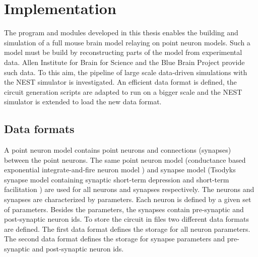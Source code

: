 %

\chapter{Implementation}

The program and modules developed in this thesis enables the building and simulation
of a full mouse brain model relaying on point neuron models. Such a model must be build by
reconstructing parts of the model from experimental data.
Allen Institute for Brain for Science and the Blue Brain Project provide such data.
To this aim, the pipeline of large scale data-driven simulations with the NEST simulator is investigated.
An efficient data format is defined, the circuit generation scripts are adapted to
run on a bigger scale and the NEST simulator is extended to load the new data format.

\section{Data formats}
\label{sec:dataformats}
A point neuron model contains point neurons and connections (synapses) between the point neurons.
The same point neuron model (conductance based exponential integrate-and-fire neuron model \cite{brette2005adaptive}) and synapse model (Tsodyks synapse model containing synaptic short-term depression and short-term facilitation \cite{tsodyks1997neural, fuhrmann2002coding}) are used for all neurons and synapses respectively.
The neurons and synapses are characterized by parameters.
Each neuron is defined by a given set of parameters.
Besides the parameters, the synapses contain pre-synaptic and post-synaptic neuron ids.
To store the circuit in files two different data formats are defined.
The first data format defines the storage for all neuron parameters.
The second data format defines the storage for synapse parameters and pre-synaptic and post-synaptic neuron ids.

